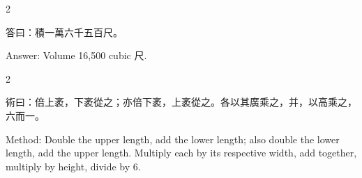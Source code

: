 \documentclass[10pt,a4paper]{article}
\begin{document}
\begin{paracol}{2}

\begin{leftcolumn*}
\begin{answerbi}[\textbf{答}]
答曰：積一萬六千五百尺。
\end{answerbi}
\end{leftcolumn*}

\begin{rightcolumn*}
\begin{answerbi}
Answer: Volume 16,500 cubic 尺.
\end{answerbi}
\end{rightcolumn*}

\end{paracol}

\begin{paracol}{2}

\begin{leftcolumn*}
\begin{methodbi}[\textbf{術}]
術曰：倍上袤，下袤從之；亦倍下袤，上袤從之。各以其廣乘之，并，以高乘之，六而一。
\end{methodbi}
\end{leftcolumn*}

\begin{rightcolumn*}
\begin{methodbi}
Method: Double the upper length, add the lower length; also double the lower length, add the upper length. Multiply each by its respective width, add together, multiply by height, divide by 6.
\end{methodbi}
\end{rightcolumn*}

\end{paracol}
\end{document}
